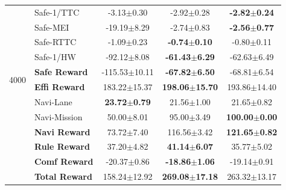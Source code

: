 {\begin{longtable}{l l c c c}
  \multirow{10}{*}{4000}
  & Safe-1/TTC       & -3.13$\pm$0.30 & -2.92$\pm$0.28 & \textbf{-2.82$\pm$0.24} \\
  & Safe-MEI         & -19.19$\pm$8.29 & -2.74$\pm$0.83 & \textbf{-2.56$\pm$0.77} \\
  & Safe-RTTC        & -1.09$\pm$0.23 & \textbf{-0.74$\pm$0.10} & -0.80$\pm$0.11 \\
  & Safe-1/HW        & -92.12$\pm$8.08 & \textbf{-61.43$\pm$6.29} & -62.63$\pm$6.49 \\
  & \textbf{Safe Reward} & -115.53$\pm$10.11 & \textbf{-67.82$\pm$6.50} & -68.81$\pm$6.54 \\
  & \textbf{Effi Reward} & 183.22$\pm$15.37 & \textbf{198.06$\pm$15.70} & 193.86$\pm$14.40 \\
  & Navi-Lane        & \textbf{23.72$\pm$0.79} & 21.56$\pm$1.00 & 21.65$\pm$0.82 \\
  & Navi-Mission     & 50.00$\pm$8.01 & 95.00$\pm$3.49 & \textbf{100.00$\pm$0.00} \\
  & \textbf{Navi Reward} & 73.72$\pm$7.40 & 116.56$\pm$3.42 & \textbf{121.65$\pm$0.82} \\
  & \textbf{Rule Reward} & 37.20$\pm$4.82 & \textbf{41.14$\pm$6.07} & 35.77$\pm$5.02 \\
  & \textbf{Comf Reward} & -20.37$\pm$0.86 & \textbf{-18.86$\pm$1.06} & -19.14$\pm$0.91 \\
  & \textbf{Total Reward} & 158.24$\pm$12.92 & \textbf{269.08$\pm$17.18} & 263.32$\pm$13.17 \\
  \midrule


\end{longtable}}
